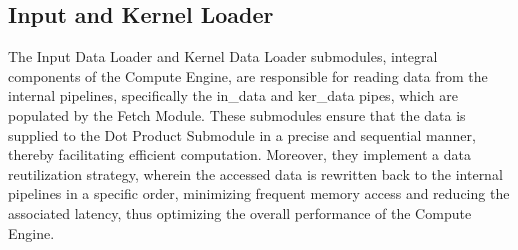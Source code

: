 \subsection{Input and Kernel Loader}
The Input Data Loader and Kernel Data Loader submodules, integral components of the Compute Engine, are responsible for reading data from the internal pipelines, specifically the in\_data and ker\_data pipes, which are populated by the Fetch Module. These submodules ensure that the data is supplied to the Dot Product Submodule in a precise and sequential manner, thereby facilitating efficient computation. Moreover, they implement a data reutilization strategy, wherein the accessed data is rewritten back to the internal pipelines in a specific order, minimizing frequent memory access and reducing the associated latency, thus optimizing the overall performance of the Compute Engine.




